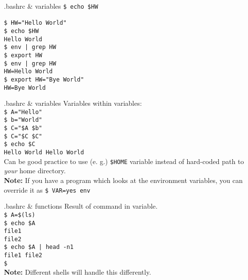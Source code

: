 \documentclass{beamer}
\let\tt\texttt
\let\bf\textbf
\let\it\itshape
\begin{document}
\begin{frame}{.bashrc \& variables}
        \tt{\$ echo \$HW }          \\
        \tt{ }                      \\
        \tt{\$ HW="Hello World" }   \\
        \tt{\$ echo \$HW }          \\
        \tt{Hello World}            \\
        \tt{\$ env | grep HW}       \\
        \tt{\$ export HW}           \\
        \tt{\$ env | grep HW}       \\
        \tt{HW=Hello World}         \\
        \tt{\$ export HW="Bye World"} \\
        \tt{HW=Bye World}           \\
\end{frame}

\begin{frame}{.bashrc \& variables}
        Variables within variables: \\
        \tt{\$ A="Hello"} \\
        \tt{\$ b="World"} \\
        \tt{\$ C="\$A \$b"} \\
        \tt{\$ C="\$C \$C"} \\
        \tt{\$ echo \$C} \\
        \tt{Hello World Hello World} \\
        Can be good practice to use (e. g.) \tt{\$HOME} variable instead of hard-coded path to {\it your} home directory. \\
        \bf{Note:} If you have a program which looks at the environment variables, you can override it as \tt{\$ VAR=yes env}
\end{frame}

\begin{frame}{.bashrc \& functions}
        Result of command in variable.  \\
        \tt{\$ A=\$(ls) }               \\
        \tt{\$ echo \$A }               \\
        \tt{file1}                      \\
        \tt{file2}                      \\
        \tt{\$ echo \$A | head -n1 }    \\
        \tt{file1 file2}                \\
        \tt{\$}                         \\
        \bf{Note:} Different shells will handle this differently.
\end{frame}
\end{document}
